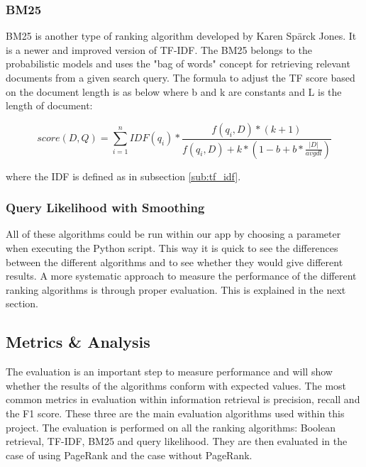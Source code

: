 
\subsubsection{BM25} %
\label{ssub:BM25}

BM25 is another type of ranking algorithm developed by Karen Spärck Jones. It is a newer and improved version of TF-IDF. The BM25 belongs to the probabilistic models and uses the "bag of words" concept for retrieving relevant documents from a given search query. The formula to adjust the TF score based on the document length is as below where b and k are constants and L is the length of document:

$$ score(D, Q) = \sum_{i=1}^n IDF(q_i) * \frac{f(q_i, D)* (k + 1)}{f(q_i, D) + k * (1-b + b * \frac{|D|}{avgdl})}$$

where the IDF is defined as in subsection \ref{sub:tf_idf}.


\subsubsection{Query Likelihood with Smoothing} %
\label{ssub:query_likelihood_with_smoothing}


All of these algorithms could be run within our app by choosing a parameter when executing the Python script. This way it is quick to see the differences between the different algorithms and to see whether they would give different results. A more systematic approach to measure the performance of the different ranking algorithms is through proper evaluation. This is explained in the next section.



\subsection{Metrics \& Analysis} %
\label{sub:metrics_&_analysis}

The evaluation is an important step to measure performance and will show whether the results of the algorithms conform with expected values. The most common metrics in evaluation within information retrieval is precision, recall and the F1 score. These three are the main evaluation algorithms used within this project. The evaluation is performed on all the ranking algorithms: Boolean retrieval, TF-IDF, BM25 and query likelihood. They are then evaluated in the case of using PageRank and the case without PageRank.

